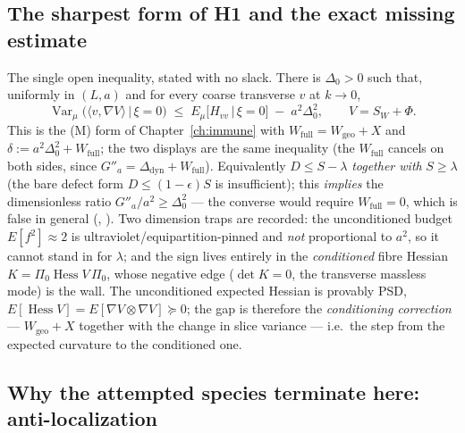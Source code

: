\subsection{The sharpest form of H1 and the exact missing estimate}
\label{app:sharp}

\LM{} The single open inequality, stated with no slack. There is $\Delta_0>0$ such that,
uniformly in $(L,a)$ and for every coarse transverse $v$ at $k\to0$,
\[
  \operatorname{Var}_\mu\!\big(\langle v,\nabla V\rangle\,\big|\,\xi=0\big)
  \;\le\;
  E_\mu\!\big[H_{vv}\,\big|\,\xi=0\big]\;-\;a^{2}\Delta_0^{2},
  \qquad V=S_W+\Phi .
\]
This is the (M) form of Chapter~\ref{ch:immune} with $W_{\mathrm{full}}=W_{\mathrm{geo}}+X$ and
$\delta:=a^{2}\Delta_0^{2}+W_{\mathrm{full}}$; the two displays are the same inequality
(the $W_{\mathrm{full}}$ cancels on both sides, since $G''_a=\Delta_{\mathrm{dyn}}+W_{\mathrm{full}}$).
Equivalently $D\le S-\lambda$ \emph{together with} $S\ge\lambda$ (the bare defect form
$D\le(1-\epsilon)S$ is insufficient); this \emph{implies} the dimensionless ratio
$G''_a/a^{2}\ge\Delta_0^{2}$ --- the converse would require $W_{\mathrm{full}}=0$, which is
false in general (, ). Two dimension traps are recorded: the unconditioned budget
$E[f^{2}]\approx2$ is ultraviolet/equipartition-pinned and \emph{not} proportional to $a^{2}$, so
it cannot stand in for $\lambda$; and the sign lives entirely in the \emph{conditioned} fibre
Hessian $K=\Pi_0\operatorname{Hess}V\,\Pi_0$, whose negative edge ($\det K=0$, the transverse
massless mode) is the wall. The unconditioned expected Hessian is provably PSD,
$E[\operatorname{Hess}V]=E[\nabla V\otimes\nabla V]\succeq0$; the gap is therefore the
\emph{conditioning correction} --- $W_{\mathrm{geo}}+X$ together with the change in slice
variance --- i.e.\ the step from the expected curvature to the conditioned one.

\subsection{Why the attempted species terminate here: anti-localization}

